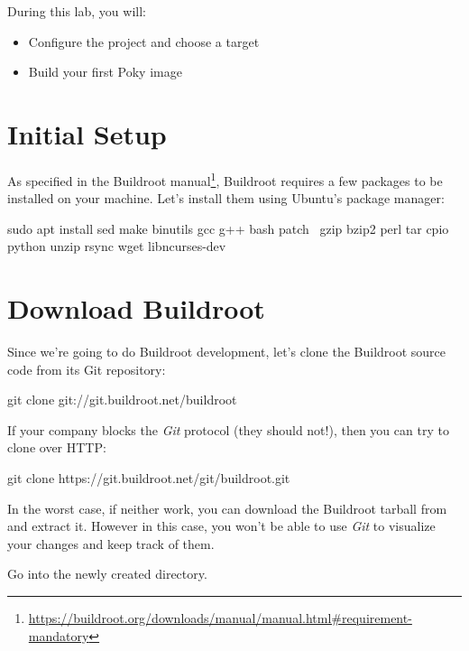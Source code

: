 
During this lab, you will:
\begin{itemize}

  \item Configure the project and choose a target
  \item Build your first Poky image
\end{itemize}

\section{Initial Setup}
As specified in the Buildroot
manual\footnote{\url{https://buildroot.org/downloads/manual/manual.html\#requirement-mandatory}},
Buildroot requires a few packages to be installed on your
machine. Let's install them using Ubuntu's package manager:

\begin{bashinput}
sudo apt install sed make binutils gcc g++ bash patch \
  gzip bzip2 perl tar cpio python unzip rsync wget libncurses-dev
\end{bashinput}

\section{Download Buildroot}

Since we're going to do Buildroot development, let's clone the
Buildroot source code from its Git repository:

\begin{bashinput}
git clone git://git.buildroot.net/buildroot
\end{bashinput}

If your company blocks the {\em Git} protocol (they should not!), then
you can try to clone over HTTP:

\begin{bashinput}
git clone https://git.buildroot.net/git/buildroot.git
\end{bashinput}

In the worst case, if neither work, you can download the Buildroot
tarball \code{buildroot-2021.02.tar.bz2} from
 and extract it. However in this
case, you won't be able to use {\em Git} to visualize your changes and
keep track of them.

Go into the newly created  directory.

